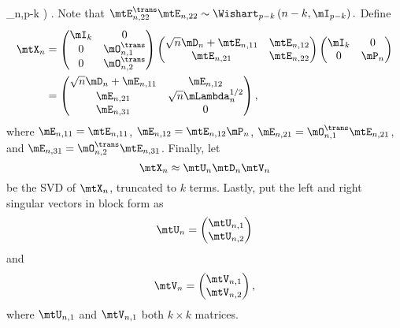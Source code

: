         \lambda_{n,p-k}
    \right)
\)
.  Note that 
\(
    \mtE_{n,22}^\trans \mtE_{n,22}
    \sim
    \Wishart_{p-k} \left( n-k, \mI_{p-k} \right).
\)
Define
\begin{align*}
    \mtX_n
        &=
            \left(
            \begin{matrix}
                \mI_k & 0 \\
                0  & \mO_{n,1}^\trans \\
                0  & \mO_{n,2}^\trans
            \end{matrix}
            \right)
            \left(
            \begin{matrix}
                \sqrt{n} \mD_n + \mtE_{n,11} & \mtE_{n,12} \\
                \mtE_{n,21}                  & \mtE_{n,22}
            \end{matrix}
            \right)
            \left(
            \begin{matrix}
                \mI_k & 0 \\
                0     & \mP_n
            \end{matrix}
            \right) \\
        &=
            \left(
            \begin{matrix}
                \sqrt{n} \mD_n + \mE_{n,11} & \mE_{n,12} \\
                \mE_{n,21}                  & \sqrt{n} \mLambda^{1/2}_n \\
                \mE_{n,31}                  & 0
            \end{matrix}
            \right),
\end{align*}
where 
$\mE_{n,11} = \mtE_{n,11}$, 
$\mE_{n,12} = \mtE_{n,12} \mP_n$,
$\mE_{n,21} = \mO_{n,1}^\trans \mtE_{n,21}$, and
$\mE_{n,31} = \mO_{n,2}^\trans \mtE_{n,31}$.
Finally, let
\[
    \mtX_n
    \approx
    \mtU_n \mtD_n \mtV_n
\]
be the SVD of $\mtX_n$, truncated to $k$ terms.  Lastly, put the left and right singular vectors in block form as
\[
    \mtU_n
    =
    \left(
    \begin{matrix}
        \mtU_{n,1} \\
        \mtU_{n,2}
    \end{matrix}
    \right)
\]
and
\[
    \mtV_n
    =
    \left(
    \begin{matrix}
        \mtV_{n,1} \\
        \mtV_{n,2}
    \end{matrix}
    \right),
\]
where $\mtU_{n,1}$ and $\mtV_{n,1}$ both $k\times k$ matrices.

